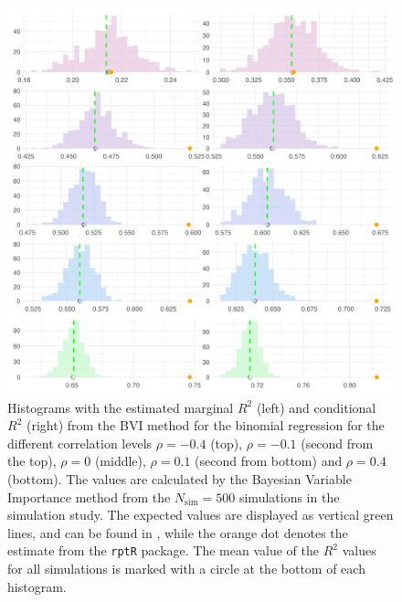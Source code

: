 
\begin{figure}[H]
  \centering
  \includegraphics[width=1.1\linewidth]{Figures/Simulation study/R2_combined_poisson.png}
  \caption[Marginal and conditional $R^2$ in Poisson GLMM]{Histograms with the estimated marginal $R^2$ (left) and conditional $R^2$ (right) from the BVI method for the binomial regression for the different correlation levels $\rho=-0.4$ (top), $\rho=-0.1$ (second from the top), $\rho=0$ (middle), $\rho=0.1$ (second from bottom) and $\rho=0.4$ (bottom). The values are calculated by the Bayesian Variable Importance method from the $N_{\text{sim}}=500$ simulations in the simulation study. The expected values are displayed as vertical green lines, and can be found in , while the orange dot denotes the estimate from the \texttt{rptR} package. The mean value of the $R^2$ values for all simulations is marked with a circle at the bottom of each histogram.}
  \label{fig:r2_combined_poisson}
\end{figure}


